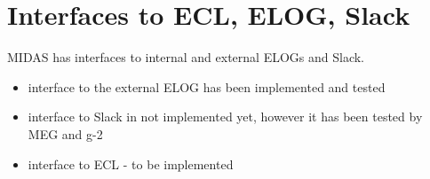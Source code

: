 \section{Interfaces to ECL, ELOG, Slack}

MIDAS has interfaces to internal and external ELOGs and Slack.
\begin{itemize}
\item
  interface to the external ELOG has been implemented and tested
\item
  interface to Slack in not implemented yet, however it has been tested by MEG  and g-2
\item
  interface to ECL - to be implemented
\end{itemize}

